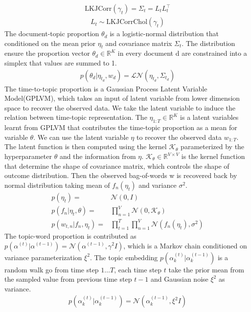 \begin{align}
\text{LKJCorr}(\gamma_{t}) = \Sigma_{t} = L_{t}L_{t}^\top
\end{align}
\begin{align}
L_{t}\sim\text{LKJCorrChol}(\gamma_{t})
\end{align}
The document-topic proportion $ \theta_d $ is a logistic-normal distribution that conditioned on the mean prior $ \eta_{t} $ and covariance matrix $ \Sigma_{t} $. The distribution ensure the proportion vector $ \theta_d\in\mathbb{R}^{K} $ in every document d are constrained into a simplex that values are summed to 1. 
\begin{align}
p(\theta_d|\eta_{t_d},w_d)=\mathcal{LN}(\eta_{t_d},\Sigma_{t_d})
\end{align}
The time-to-topic proportion is a Gaussian Process Latent Variable Model(GPLVM), which takes an input of latent variable from lower dimension space to recover the observed data. We take the latent variable to induce the relation between time-topic representation. 
The $ \eta_{1:T}\in\mathbb{R}^{K} $ is a latent variables learnt from GPLVM that contributes the time-topic proportion as a mean for variable $ \theta $. We can use the latent variable $ \eta $ to recover the observed data $ w_{1:T} $. The latent function is then computed using the kernel $ \mathcal{K}_{\theta} $ parameterized by the hyperparameter $ \theta $ and the information from $ \eta $. $ \mathcal{K}_\theta\in\mathbb{R}^{V\times V} $ is the kernel function that determine the shape of covariance matrix, which controls the shape of outcome distribution. 
Then the observed bag-of-words w is recovered back by normal distribution taking mean of $ f_n(\eta_t) $ and variance $ \sigma^2 $.
\begin{align}
p(\eta_t)=&\mathcal{N}(0,I)\\
p(f_n|\eta_t,\theta)=&\prod_{n=1}^{V}\mathcal{N}(0,\mathcal{K}_\theta)\\
p(w_{t,n}|f_n,\eta_t)=&\prod_{t=1}^{T}\prod_{n=1}^{V}\mathcal{N}(f_n(\eta_t),\sigma^2)
\end{align}
The topic-word proportion is contributed as $ p(\alpha^{(t)}|\alpha^{(t-1)})=\mathcal{N}(\alpha^{(t-1)},\gamma^2I) $, which is a Markov chain conditioned on variance parameterization $ \xi^2 $. The topic embedding $ p(\alpha_k^{(t)}|\alpha_k^{(t-1)}) $ is a random walk go from time step $ 1\dots T $, each time step $ t $ take the prior mean from the sampled value from previous time step $ t-1 $ and Gaussian noise $ \xi^2 $ as variance.
\begin{align}
p(\alpha_k^{(t)}|\alpha_k^{(t-1)})=\mathcal{N}(\alpha_k^{(t-1)},\xi^2I)
\end{align}